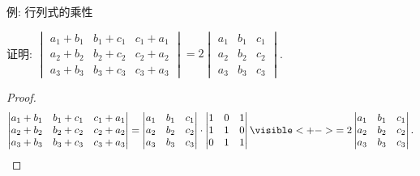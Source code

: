 \begin{frame}{例: 行列式的乘性}
	\onslide<+->
	\begin{example}
		证明:
		$\begin{vmatrix}
			a_1+b_1&b_1+c_1&c_1+a_1\\
			a_2+b_2&b_2+c_2&c_2+a_2\\
			a_3+b_3&b_3+c_3&c_3+a_3
		\end{vmatrix}=2\begin{vmatrix}
			a_1&b_1&c_1\\
			a_2&b_2&c_2\\
			a_3&b_3&c_3
		\end{vmatrix}$.
	\end{example}
	\onslide<+->
	\begin{proof}
		\[\begin{vmatrix}
			a_1+b_1&b_1+c_1&c_1+a_1\\
			a_2+b_2&b_2+c_2&c_2+a_2\\
			a_3+b_3&b_3+c_3&c_3+a_3
		\end{vmatrix}=\begin{vmatrix}
			a_1&b_1&c_1\\
			a_2&b_2&c_2\\
			a_3&b_3&c_3
		\end{vmatrix}\cdot\begin{vmatrix}
			1&0&1\\
			1&1&0\\
			0&1&1
		\end{vmatrix}\visible<+->{=2\begin{vmatrix}
			a_1&b_1&c_1\\
			a_2&b_2&c_2\\
			a_3&b_3&c_3
		\end{vmatrix}.}\qedhere\]
	\end{proof}
\end{frame}


